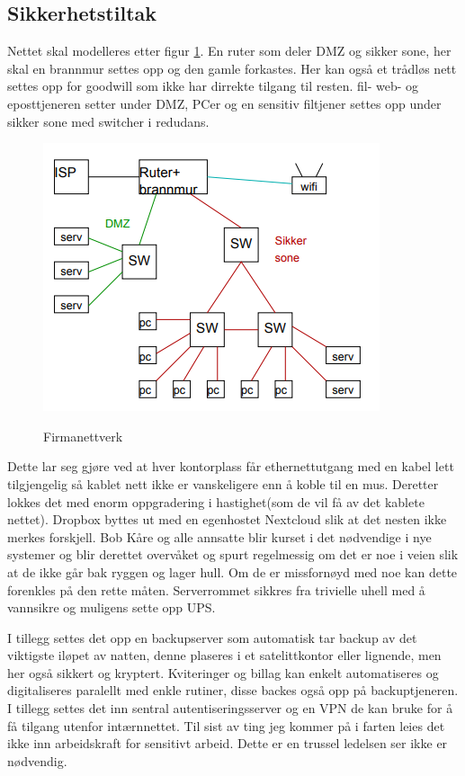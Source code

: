 \documentclass[12pt,a4paper,norsk]{article}
\begin{document}
\subsection*{Sikkerhetstiltak}
Nettet skal modelleres etter figur \ref{fig:firmanettverk}. En ruter som deler DMZ og sikker sone, her skal en brannmur settes opp og den gamle forkastes. Her kan også et trådløs nett settes opp for goodwill som ikke har dirrekte tilgang til resten. fil- web- og eposttjeneren setter under DMZ, PCer og en sensitiv filtjener settes opp under sikker sone med switcher i redudans.
\begin{figure}[H]
\centering
\caption{Firmanettverk}
\includegraphics[scale=0.5]{firmanettverk.png}
\label{fig:firmanettverk}
\end{figure}
 Dette lar seg gjøre ved at hver kontorplass får ethernettutgang med en kabel lett tilgjengelig så kablet nett ikke er vanskeligere enn å koble til en mus. Deretter lokkes det med enorm oppgradering i hastighet(som de vil få av det kablete nettet). Dropbox byttes ut med en egenhostet Nextcloud slik at det nesten ikke merkes forskjell. Bob Kåre og alle annsatte blir kurset i det nødvendige i nye systemer og blir derettet overvåket og spurt regelmessig om det er noe i veien slik at de ikke går bak ryggen og lager hull. Om de er missfornøyd med noe kan dette forenkles på den rette måten. Serverrommet sikkres fra trivielle uhell med å vannsikre og muligens sette opp UPS.

 I tillegg settes det opp en backupserver som automatisk tar backup av det viktigste iløpet av natten, denne plaseres i et satelittkontor eller lignende, men her også sikkert og kryptert. Kviteringer og billag kan enkelt automatiseres og digitaliseres paralellt med enkle rutiner, disse backes også opp på backuptjeneren. I tillegg settes det inn sentral autentiseringsserver og en VPN de kan bruke for å få tilgang utenfor intærnnettet. Til sist av ting jeg kommer på i farten leies det ikke inn arbeidskraft for sensitivt arbeid. Dette er en trussel ledelsen ser ikke er nødvendig.
\end{document}

